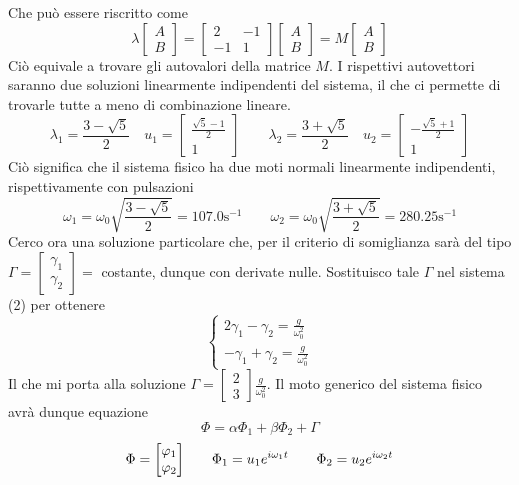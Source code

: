 \documentclass{scrartcl}
\renewcommand{\phi}{\varphi}
\begin{document}
    Che può essere riscritto come
    \begin{equation}
        \lambda \begin{bmatrix} A \\ B \end{bmatrix} = \begin{bmatrix} 2 & -1 \\ -1 & 1 \end{bmatrix} \begin{bmatrix} A \\ B \end{bmatrix} = M \begin{bmatrix} A \\ B \end{bmatrix}
    \end{equation}
    Ciò equivale a trovare gli autovalori della matrice \(M\). I rispettivi autovettori saranno due soluzioni linearmente indipendenti del sistema, il che ci permette di trovarle tutte a meno di combinazione lineare.
    \begin{equation}
        \lambda_1 = \frac{3-\sqrt{5}}{2} \quad u_1 = \begin{bmatrix} \frac{\sqrt{5}-1}{2} \\ 1 \end{bmatrix} \qquad \lambda_2 = \frac{3+\sqrt{5}}{2} \quad u_2 = \begin{bmatrix} - \frac{\sqrt{5}+1}{2} \\  1\end{bmatrix}
    \end{equation}
    Ciò significa che il sistema fisico ha due moti normali linearmente indipendenti, rispettivamente con pulsazioni
    \[\omega_1 = \omega_0 \sqrt{\frac{3-\sqrt{5}}{2}} = 107.0 \text{s}^{-1} \qquad \omega_2 = \omega_0 \sqrt{\frac{3+\sqrt{5}}{2}} = 280.25 \text{s}^{-1}\]
    Cerco ora una soluzione particolare che, per il criterio di somiglianza sarà del tipo \(\Gamma = \begin{bmatrix}\gamma_1 \\ \gamma_2\end{bmatrix} = \) costante, dunque con derivate nulle. Sostituisco tale \(\Gamma\) nel sistema (2) per ottenere
    \begin{equation}
        \begin{cases}
            2 \gamma_1 -\gamma_2 = \frac{g}{\omega_0^2} \\
            - \gamma_1 + \gamma_2 = \frac{g}{\omega_0^2}
        \end{cases}
    \end{equation}
    Il che mi porta alla soluzione \(\Gamma = \begin{bmatrix}2 \\ 3\end{bmatrix} \frac{g}{\omega_0^2}\).
    Il moto generico del sistema fisico avrà dunque equazione
    \begin{equation}
        \Phi = \alpha \Phi_1 + \beta \Phi_2 + \Gamma 
    \end{equation}
    \[\Phi = \mqty[\phi_1 \\ \phi_2] \qquad \Phi_1 = u_1 e^{i \omega_1 t} \qquad \Phi_2 = u_2 e^{i \omega_2 t}\]
\end{document}
